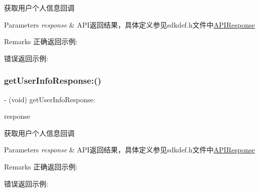 获取用户个人信息回调 
\begin{DoxyParams}{Parameters}
{\em response} & A\+P\+I返回结果，具体定义参见sdkdef.\+h文件中\mbox{\hyperlink{interface_a_p_i_response}{A\+P\+I\+Response}} \\
\hline
\end{DoxyParams}
\begin{DoxyRemark}{Remarks}
正确返回示例\+: 
\begin{DoxyCodeInclude}
\end{DoxyCodeInclude}
 错误返回示例\+: 
\begin{DoxyCodeInclude}
\end{DoxyCodeInclude}

\end{DoxyRemark}
\mbox{\label{protocol_tencent_session_delegate-p_a9cff2e12ed27916e865c8048ee0c176c}} 
\subsubsection{\texorpdfstring{get\+User\+Info\+Response\+:()}{getUserInfoResponse:()}\hspace{0.1cm}{\footnotesize\ttfamily [2/2]}}
{\footnotesize\ttfamily -\/ (void) get\+User\+Info\+Response\+: \begin{DoxyParamCaption}\item[{(\mbox{\hyperlink{interface_a_p_i_response}{A\+P\+I\+Response}} $\ast$)}]{response }\end{DoxyParamCaption}\hspace{0.3cm}{\ttfamily [optional]}}

获取用户个人信息回调 
\begin{DoxyParams}{Parameters}
{\em response} & A\+P\+I返回结果，具体定义参见sdkdef.\+h文件中\mbox{\hyperlink{interface_a_p_i_response}{A\+P\+I\+Response}} \\
\hline
\end{DoxyParams}
\begin{DoxyRemark}{Remarks}
正确返回示例\+: 
\begin{DoxyCodeInclude}
\end{DoxyCodeInclude}
 错误返回示例\+: 
\begin{DoxyCodeInclude}
\end{DoxyCodeInclude}

\end{DoxyRemark}
\mbox{\label{protocol_tencent_session_delegate-p_ad0d91a95626727d1dc20fb96df2d442a}} 
